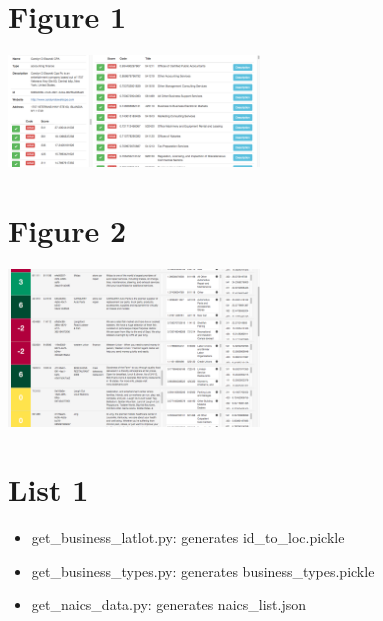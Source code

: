 \documentclass[letterpaper, 10 pt, conference]{IEEEtran}
\begin{document}
\appendix
\section*{Figure 1}
\includegraphics[width=0.5\textwidth]{handclassifier.png}

\section*{Figure 2}
\includegraphics[width=0.5\textwidth]{database.png}

\section*{List 1}
\begin{itemize}
\item get\_business\_latlot.py: generates id\_to\_loc.pickle
\item get\_business\_types.py: generates business\_types.pickle
\item get\_naics\_data.py: generates naics\_list.json
\end{itemize}
\end{document}
